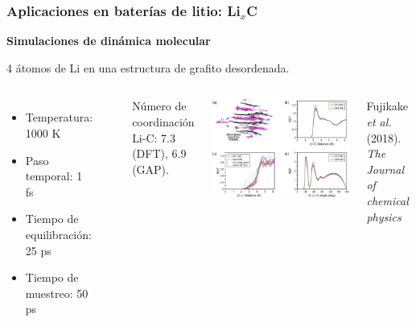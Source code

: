 \documentclass[aspectratio=169]{beamer}
\let\oldtextbf\textbf
\renewcommand{\textbf}[1]{\textcolor{nordblue}{\oldtextbf{#1}}}
\begin{document}
    \begin{frame}
        \frametitle{Aplicaciones en baterías de litio: Li$_x$C}

        \textbf{Simulaciones de dinámica molecular}

        4 átomos de Li en una estructura de grafito desordenada.
        
        \begin{columns}
            \begin{itemize}
                \item Temperatura: 1000 K
                \item Paso temporal: 1 fs
                \item Tiempo de equilibración: 25 ps 
                \item Tiempo de muestreo: 50 ps
            \end{itemize}

            \ \pause

            Número de coordinación Li-C: 7.3 (DFT), 6.9 (GAP).

            \begin{center}
                \includegraphics[width=\columnwidth]{LiC-MD-results.png}
            \end{center}
            \tiny{Fujikake \textit{et al.} (2018). \textit{The Journal of chemical
            physics}}
        \end{columns}
    \end{frame}
    
\end{document}
